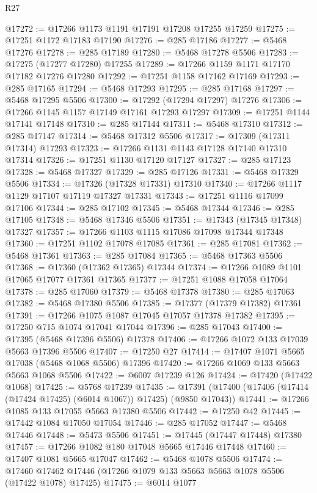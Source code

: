 \begin{lexlean}{R27}
\begin{coremodule}
@17272 := @17266 @1173 @1191 @17191 @17208 @17255 @17259
@17275 := @17251 @1172 @17183 @17190
@17276 := @285 @17186
@17277 := @5468 @17276
@17278 := @285 @17189
@17280 := @5468 @17278 @5506
@17283 := @17275 (@17277 @17280) @17255
@17289 := @17266 @1159 @1171 @17170 @17182 @17276 @17280
@17292 := @17251 @1158 @17162 @17169
@17293 := @285 @17165
@17294 := @5468 @17293
@17295 := @285 @17168
@17297 := @5468 @17295 @5506
@17300 := @17292 (@17294 @17297) @17276
@17306 := @17266 @1145 @1157 @17149 @17161 @17293 @17297
@17309 := @17251 @1144 @17141 @17148
@17310 := @285 @17144
@17311 := @5468 @17310
@17312 := @285 @17147
@17314 := @5468 @17312 @5506
@17317 := @17309 (@17311 @17314) @17293
@17323 := @17266 @1131 @1143 @17128 @17140 @17310 @17314
@17326 := @17251 @1130 @17120 @17127
@17327 := @285 @17123
@17328 := @5468 @17327
@17329 := @285 @17126
@17331 := @5468 @17329 @5506
@17334 := @17326 (@17328 @17331) @17310
@17340 := @17266 @1117 @1129 @17107 @17119 @17327 @17331
@17343 := @17251 @1116 @17099 @17106
@17344 := @285 @17102
@17345 := @5468 @17344
@17346 := @285 @17105
@17348 := @5468 @17346 @5506
@17351 := @17343 (@17345 @17348) @17327
@17357 := @17266 @1103 @1115 @17086 @17098 @17344 @17348
@17360 := @17251 @1102 @17078 @17085
@17361 := @285 @17081
@17362 := @5468 @17361
@17363 := @285 @17084
@17365 := @5468 @17363 @5506
@17368 := @17360 (@17362 @17365) @17344
@17374 := @17266 @1089 @1101 @17065 @17077 @17361 @17365
@17377 := @17251 @1088 @17058 @17064
@17378 := @285 @17060
@17379 := @5468 @17378
@17380 := @285 @17063
@17382 := @5468 @17380 @5506
@17385 := @17377 (@17379 @17382) @17361
@17391 := @17266 @1075 @1087 @17045 @17057 @17378 @17382
@17395 := @17250 @715 @1074 @17041 @17044
@17396 := @285 @17043
@17400 := @17395 (@5468 @17396 @5506) @17378
@17406 := @17266 @1072 @133 @17039 @5663 @17396 @5506
@17407 := @17250 @27
@17414 := @17407 @1071 @5665 @17038 (@5468 @1068 @5506) @17396
@17420 := @17266 @1069 @133 @5663 @5663 @1068 @5506
@17422 := @6007 @17239 @126
@17424 := @17420 (@17422 @1068)
@17425 := @5768 @17239
@17435 := @17391 (@17400 (@17406 (@17414 (@17424 @17425) (@6014 @1067)) @17425) (@9850 @17043))
@17441 := @17266 @1085 @133 @17055 @5663 @17380 @5506
@17442 := @17250 @42
@17445 := @17442 @1084 @17050 @17054
@17446 := @285 @17052
@17447 := @5468 @17446
@17448 := @5473 @5506
@17451 := @17445 (@17447 @17448) @17380
@17457 := @17266 @1082 @180 @17048 @5665 @17446 @17448
@17460 := @17407 @1081 @5665 @17047
@17462 := @5468 @1078 @5506
@17474 := @17460 @17462 @17446 (@17266 @1079 @133 @5663 @5663 @1078 @5506 (@17422 @1078) @17425)
@17475 := @6014 @1077

\end{coremodule}
\end{lexlean}
